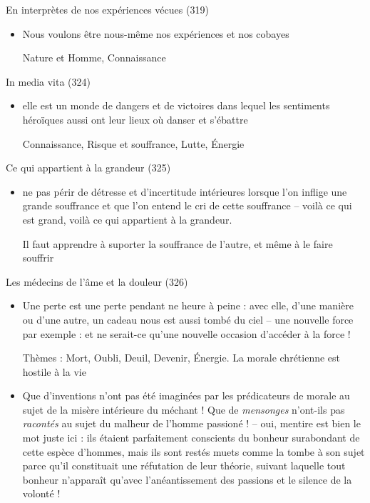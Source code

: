\documentclass[french,a4paper,11pt,answers]{exam}
\newcommand{\cit}[2]{\og #1 \fg{} \begin{solution}{ #2 }\end{solution}} %
\begin{document}
	\begin{cadre}{En interprètes de nos expériences vécues (319)}
		\begin{itemize}
			\item \cit{Nous voulons être nous-même nos expériences et nos cobayes}
				{Nature et Homme, Connaissance}
		\end{itemize}
	\end{cadre}
	
	\begin{cadre}{In media vita (324)}
		\begin{itemize}
			\item \cit{elle est un monde de dangers et de victoires dans lequel les sentiments héroïques aussi ont leur lieux où danser et s'ébattre}
				{Connaissance, Risque et souffrance, Lutte, Énergie}
		\end{itemize}
	\end{cadre}

	\begin{cadre}{Ce qui appartient à la grandeur (325)}
		\begin{itemize}
			\item \cit{ne pas périr de détresse et d'incertitude intérieures lorsque l'on inflige une grande souffrance et que l'on entend le cri de cette souffrance -- voilà ce qui est grand, voilà ce qui appartient à la grandeur.}
				{Il faut apprendre à suporter la souffrance de l'autre, et même à le faire souffrir}
		\end{itemize}
	\end{cadre}
	
	\begin{cadre}{Les médecins de l'âme et la douleur (326)}
		\begin{itemize}
			\item \cit{Une perte est une perte pendant ne heure à peine : avec elle, d'une manière ou d'une autre, un cadeau nous est aussi tombé du ciel -- une nouvelle force par exemple : et ne serait-ce qu'une nouvelle occasion d'accéder à la force !}
				{Thèmes : Mort, Oubli, Deuil, Devenir, Énergie. La morale chrétienne est hostile à la vie}
			\item \cit{Que d'inventions n'ont pas été imaginées par les prédicateurs de morale au sujet de la \og misère \fg{} intérieure du méchant ! Que de \emph{mensonges} n'ont-ils pas \emph{racontés} au sujet du malheur de l'homme passioné ! -- oui, mentire est bien le mot juste ici : ils étaient parfaitement conscients du bonheur surabondant de cette espèce d'hommes, mais ils sont restés muets comme la tombe à son sujet parce qu'il constituait une réfutation de leur théorie, suivant laquelle tout bonheur n'apparaît qu'avec l'anéantissement des passions et le silence de la volonté !}
				{}
		\end{itemize}
	\end{cadre}
\end{document}
